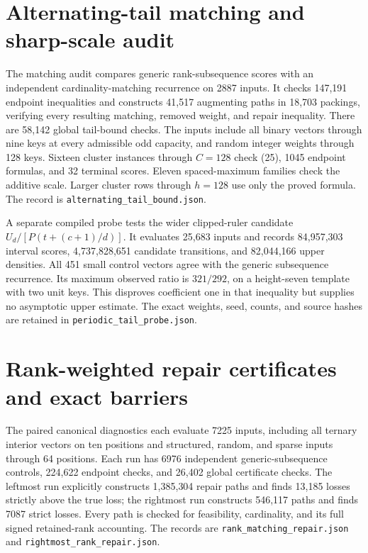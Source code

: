 \documentclass[11pt]{article}
\begin{document}
\section{Alternating-tail matching and sharp-scale audit}
\label{app:alternating-tail-bound}
The matching audit compares generic rank-subsequence scores with an
independent cardinality-matching recurrence on 2887 inputs. It checks
147,191 endpoint inequalities and constructs 41,517 augmenting paths
in 18,703 packings, verifying every resulting matching, removed weight,
and repair inequality. There are 58,142 global tail-bound checks.
The inputs include all binary vectors through nine keys at every
admissible odd capacity, and random integer weights through 128 keys.
Sixteen cluster instances through $C=128$ check
(25), 1045 endpoint formulas, and 32
terminal scores. Eleven spaced-maximum families check the additive
scale. Larger cluster rows through $h=128$ use only the proved formula.
The record is \texttt{alternating\_tail\_bound.json}.

A separate compiled probe tests the wider clipped-ruler candidate
$U_d/[P(t+(c+1)/d)]$. It evaluates 25,683 inputs and records 84,957,303
interval scores, 4,737,828,651 candidate transitions, and 82,044,166
upper densities. All 451 small control vectors agree with the generic
subsequence recurrence. Its maximum observed ratio is $321/292$, on
a height-seven template with two unit keys. This disproves coefficient
one in that inequality but supplies no asymptotic upper estimate.
The exact weights, seed, counts, and source hashes are retained in
\texttt{periodic\_tail\_probe.json}.

\section{Rank-weighted repair certificates and exact barriers}
\label{app:rank-repair-barrier}
The paired canonical diagnostics each evaluate 7225 inputs, including
all ternary interior vectors on ten positions and structured, random,
and sparse inputs through 64 positions. Each run has 6976 independent
generic-subsequence controls, 224,622 endpoint checks, and 26,402 global
certificate checks. The leftmost run explicitly constructs 1,385,304
repair paths and finds 13,185 losses strictly above the true loss; the
rightmost run constructs 546,117 paths and finds 7087 strict losses.
Every path is checked for feasibility, cardinality, and its full signed
retained-rank accounting. The records are
\texttt{rank\_matching\_repair.json} and
\texttt{rightmost\_rank\_repair.json}.
\end{document}

